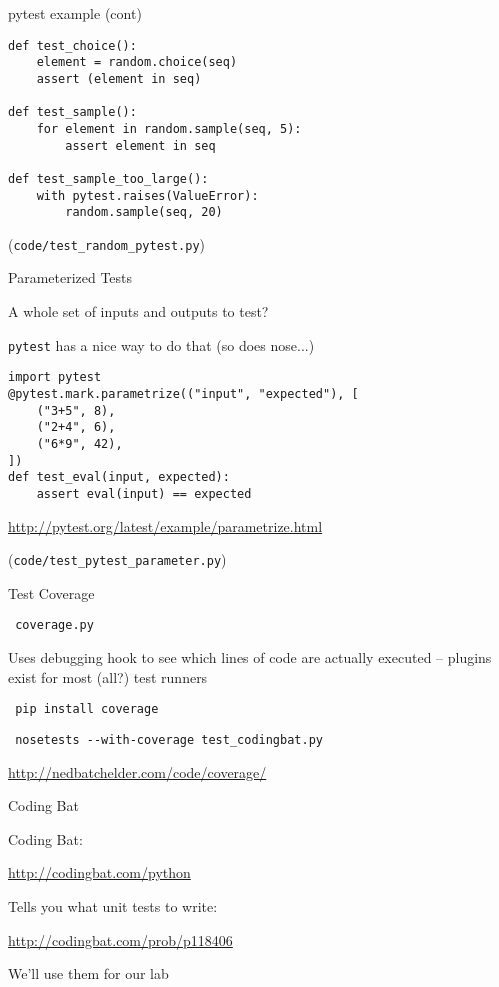 \documentclass{beamer}
\begin{document}
\begin{frame}[fragile]{pytest example (cont) }

{\small
\begin{verbatim}
def test_choice():
    element = random.choice(seq)
    assert (element in seq)

def test_sample():
    for element in random.sample(seq, 5):
        assert element in seq

def test_sample_too_large():
    with pytest.raises(ValueError):
        random.sample(seq, 20)
\end{verbatim}
}

\vfill
(\verb|code/test_random_pytest.py|)

\end{frame} 


\begin{frame}[fragile]{Parameterized Tests}

{\Large A whole set of inputs and outputs to test?}

\vfill
{\Large \verb|pytest| has a nice way to do that (so does nose...)}

\begin{verbatim}
import pytest
@pytest.mark.parametrize(("input", "expected"), [
    ("3+5", 8),
    ("2+4", 6),
    ("6*9", 42),
])
def test_eval(input, expected):
    assert eval(input) == expected
\end{verbatim}

\url{http://pytest.org/latest/example/parametrize.html}

\vfill
(\verb|code/test_pytest_parameter.py|)
\end{frame} 

\begin{frame}[fragile]{Test Coverage}

{\LARGE \verb|￼coverage.py |}

\vfill
{\Large Uses debugging hook to see which lines of code are actually executed
-- plugins exist for most (all?) test runners}

\vfill
{\Large \verb|￼pip install coverage |}

\vfill
{\Large \verb|￼nosetests --with-coverage test_codingbat.py|}

\vfill
\url{http://nedbatchelder.com/code/coverage/}
\end{frame}

\begin{frame}[fragile]{Coding Bat}

{\LARGE Coding Bat:}

\url{http://codingbat.com/python}


\vfill
{\Large Tells you what unit tests to write:}

\url{http://codingbat.com/prob/p118406}

\vfill
{\Large We'll use them for our lab}

\end{frame}
\end{document}
